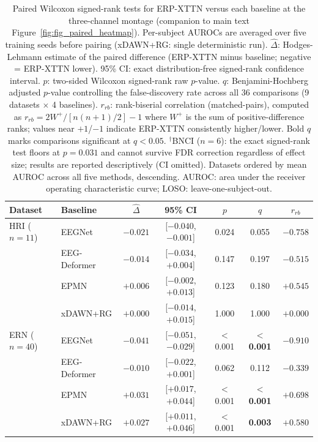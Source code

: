 \begin{table}[t]
\centering
\setlength{\tabcolsep}{4pt}
\caption{%
Paired Wilcoxon signed-rank tests for ERP-XTTN versus each baseline at the three-channel montage (companion to main text Figure~\ref{fig:fig_paired_heatmap}). Per-subject AUROCs are averaged over five training seeds before pairing (xDAWN+RG: single deterministic run). $\hat{\Delta}$: Hodges-Lehmann estimate of the paired difference (ERP-XTTN minus baseline; negative = ERP-XTTN lower). 95\% CI: exact distribution-free signed-rank confidence interval. $p$: two-sided Wilcoxon signed-rank raw $p$-value. $q$: Benjamini-Hochberg adjusted $p$-value controlling the false-discovery rate across all 36 comparisons (9 datasets $\times$ 4 baselines). $r_{rb}$: rank-biserial correlation (matched-pairs), computed as $r_{rb} = 2W^{+} / [n(n+1)/2] - 1$ where $W^{+}$ is the sum of positive-difference ranks; values near $+1$/$-1$ indicate ERP-XTTN consistently higher/lower. Bold $q$ marks comparisons significant at $q < 0.05$. $^\dagger$BNCI ($n=6$): the exact signed-rank test floors at $p = 0.031$ and cannot survive FDR correction regardless of effect size; results are reported descriptively (CI omitted). Datasets ordered by mean AUROC across all five methods, descending. AUROC: area under the receiver operating characteristic curve; LOSO: leave-one-subject-out.%
}
\label{sup:tab-wilcoxon}
\begin{tabular}{llccccc}
\toprule
Dataset & Baseline & $\hat{\Delta}$ & 95\% CI & $p$ & $q$ & $r_{rb}$ \\
\midrule
HRI ($n{=}11$) & EEGNet & $-0.021$ & [$-0.040$, $-0.001$] & 0.024 & 0.055 & $-0.758$ \\
 & EEG-Deformer & $-0.014$ & [$-0.034$, $+0.004$] & 0.147 & 0.197 & $-0.515$ \\
 & EPMN & $+0.006$ & [$-0.002$, $+0.013$] & 0.123 & 0.180 & $+0.545$ \\
 & xDAWN+RG & $+0.000$ & [$-0.014$, $+0.015$] & 1.000 & 1.000 & $+0.000$ \\
\midrule
ERN ($n{=}40$) & EEGNet & $-0.041$ & [$-0.051$, $-0.029$] & $<$0.001 & \textbf{$<$0.001} & $-0.910$ \\
 & EEG-Deformer & $-0.010$ & [$-0.022$, $+0.001$] & 0.062 & 0.112 & $-0.339$ \\
 & EPMN & $+0.031$ & [$+0.017$, $+0.044$] & $<$0.001 & \textbf{$<$0.001} & $+0.698$ \\
 & xDAWN+RG & $+0.027$ & [$+0.011$, $+0.046$] & $<$0.001 & \textbf{0.003} & $+0.580$ \\

\end{tabular}
\end{table}
